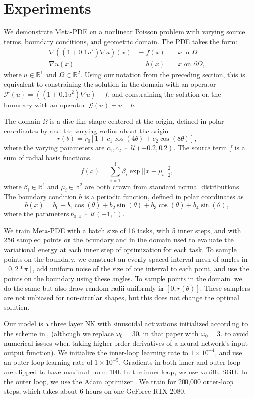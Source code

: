 \section{Experiments}
We demonstrate Meta-PDE on a nonlinear Poisson problem with varying
source terms, boundary conditions, and geometric domain.
The PDE takes the form:
\begin{align*}
\nabla \dot{} ((1 + 0.1 u^2) \nabla u)(x) &= f(x) \quad &x \text{ in } \Omega\\
\nabla \dot{} u(x) &= b(x) \quad &x \text{ on } \partial\Omega,
\end{align*}
where $u \in \mathbb{R}^1$ and $\Omega \subset \mathbb{R}^2$.
Using our notation from the preceding section, this is equivalent to
constraining the solution in the domain with an operator~${
\mathcal{F}(u) = ((1 + 0.1 u^2) \nabla u) - f}$, and constraining
the solution on the boundary with an operator~${\mathcal{G}(u) = u - b}$.

The domain $\Omega$ is a disc-like shape centered at the origin, defined in polar coordinates by  and the varying
radius about the origin
\[
r(\theta) = r_0[1 + c_1 \cos(4\theta) + c_2 \cos(8\theta)],
\]
where the varying parameters are $c_1, c_2 \sim \mathcal{U}(-0.2, 0.2)$.
The source term $f$ is a sum of radial basis functions,
\[
f(x) = \sum_{i=1}^3 \beta_i \exp{||x - \mu_i||_2^2},
\]
where $\beta_i \in \mathbb{R}^1$ and $\mu_i \in \mathbb{R}^2$ are both drawn from
standard normal distributions.
The boundary condition $b$ is a periodic function, defined in polar coordinates as
\[
b(x) = b_0 + b_1 \cos(\theta) + b_2 \sin(\theta) + b_3 \cos(\theta) + b_4 \sin(\theta),
\]
where the parameters $b_{0:4} \sim \mathcal{U}(-1, 1)$.

We train Meta-PDE with a batch size of 16 tasks, with 5 inner steps,
and with 256 sampled points on the boundary and in the domain used to evaluate the
variational energy at each inner step of optimization for each task.
To sample points on the boundary, we construct an evenly spaced interval mesh of
angles in
$[0, 2 * \pi]$, add uniform noise of the size of one interval to each point, and use
the points on the boundary using these angles.
To sample points in the domain, we do the same but also draw random radii uniformly in
$[0, r(\theta)]$.
These samplers are not unbiased for non-circular shapes,
but this does not change the optimal solution.

Our model is a three layer NN with sinusoidal activations initialized according to
the scheme in \citet{sitzmann2020implicit},
(although we replace $\omega_0 = 30.$ in that paper with $\omega_0 = 3.$
to avoid numerical issues when taking higher-order derivatives of
a neural network's input-output function).
We initialize the inner-loop learning rate to $1\times 10^{-4}$, and use an outer loop learning
rate of $1\times 10^{-5}$.
Gradients in both inner and outer loop are clipped to have maximal norm $100$.
In the inner loop, we use vanilla SGD.
In the outer loop, we use the Adam optimizer \citep{kingma2014adam}.
We train for 200,000 outer-loop steps, which takes about 6 hours on one
GeForce RTX 2080.


